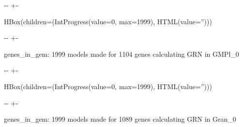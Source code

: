 \documentclass[letterpaper,10pt,english]{sphinxmanual}
\newlength\nbsphinxcodecellspacing
\begin{document}
{

\kern-\sphinxverbatimsmallskipamount\kern-\baselineskip
\kern+\FrameHeightAdjust\kern-\fboxrule
\vspace{\nbsphinxcodecellspacing}

\begin{sphinxVerbatim}[commandchars=\\\{\}]
HBox(children=(IntProgress(value=0, max=1999), HTML(value='')))
\end{sphinxVerbatim}
}

{

\kern-\sphinxverbatimsmallskipamount\kern-\baselineskip
\kern+\FrameHeightAdjust\kern-\fboxrule
\vspace{\nbsphinxcodecellspacing}

\begin{sphinxVerbatim}[commandchars=\\\{\}]

genes\_in\_gem: 1999
models made for 1104 genes
calculating GRN in GMPl\_0
\end{sphinxVerbatim}
}

{

\kern-\sphinxverbatimsmallskipamount\kern-\baselineskip
\kern+\FrameHeightAdjust\kern-\fboxrule
\vspace{\nbsphinxcodecellspacing}

\begin{sphinxVerbatim}[commandchars=\\\{\}]
HBox(children=(IntProgress(value=0, max=1999), HTML(value='')))
\end{sphinxVerbatim}
}

{

\kern-\sphinxverbatimsmallskipamount\kern-\baselineskip
\kern+\FrameHeightAdjust\kern-\fboxrule
\vspace{\nbsphinxcodecellspacing}

\begin{sphinxVerbatim}[commandchars=\\\{\}]

genes\_in\_gem: 1999
models made for 1089 genes
calculating GRN in Gran\_0
\end{sphinxVerbatim}
}
\end{document}
